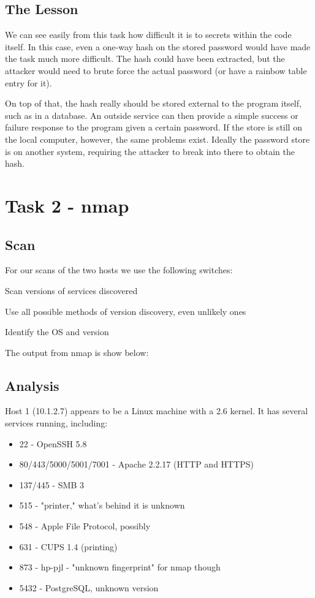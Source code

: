 \documentclass{article}
\begin{document}
\subsection{The Lesson}
\par We can see easily from this task how difficult it is to secrets within the code itself. In this case, even a one-way hash on the stored password would have made the task much more difficult. The hash could have been extracted, but the attacker would need to brute force the actual password (or have a rainbow table entry for it).

\par On top of that, the hash really should be stored external to the program itself, such as in a database. An outside service can then provide a simple success or failure response to the program given a certain password. If the store is still on the local computer, however, the same problems exist. Ideally the password store is on another system, requiring the attacker to break into there to obtain the hash.

\FloatBarrier
\section{Task 2 - nmap}
\subsection{Scan}
\par For our scans of the two hosts we use the following switches:
\begin{description}\itemsep-2pt
	\item[-sV] Scan versions of services discovered
	\item[--version-all] Use all possible methods of version discovery, even unlikely ones
	\item[-O] Identify the OS and version
\end{description}

\par The output from nmap is show below:


\subsection{Analysis}
Host 1 (10.1.2.7) appears to be a Linux machine with a 2.6 kernel. It has several services running, including:
\begin{itemize}
	\item 22 - OpenSSH 5.8
	\item 80/443/5000/5001/7001 - Apache 2.2.17 (HTTP and HTTPS)
	\item 137/445 - SMB 3
	\item 515 - "printer," what's behind it is unknown
	\item 548 - Apple File Protocol, possibly
	\item 631 - CUPS 1.4 (printing)
	\item 873 - hp-pjl - "unknown fingerprint" for nmap though
	\item 5432 - PostgreSQL, unknown version
\end{itemize}
\end{document}
